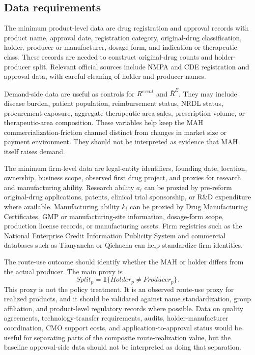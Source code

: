 \documentclass[12pt]{article}
\newcommand{\1}{\mathbf{1}}
\begin{document}
\subsection{Data requirements}

The minimum product-level data are drug registration and approval records with product name, approval date, registration category, original-drug classification, holder, producer or manufacturer, dosage form, and indication or therapeutic class. These records are needed to construct original-drug counts and holder-producer split. Relevant official sources include NMPA and CDE registration and approval data, with careful cleaning of holder and producer names.

Demand-side data are useful as controls for $R^{event}$ and $\bar R^E$. They may include disease burden, patient population, reimbursement status, NRDL status, procurement exposure, aggregate therapeutic-area sales, prescription volume, or therapeutic-area composition. These variables help keep the MAH commercialization-friction channel distinct from changes in market size or payment environment. They should not be interpreted as evidence that MAH itself raises demand.

The minimum firm-level data are legal-entity identifiers, founding date, location, ownership, business scope, observed first drug project, and proxies for research and manufacturing ability. Research ability $a_i$ can be proxied by pre-reform original-drug applications, patents, clinical trial sponsorship, or R\&D expenditure where available. Manufacturing ability $k_i$ can be proxied by Drug Manufacturing Certificates, GMP or manufacturing-site information, dosage-form scope, production license records, or manufacturing assets. Firm registries such as the National Enterprise Credit Information Publicity System and commercial databases such as Tianyancha or Qichacha can help standardize firm identities.

The route-use outcome should identify whether the MAH or holder differs from the actual producer. The main proxy is
\begin{equation}
    Split_p=\1\{Holder_p\ne Producer_p\}.
    \label{eq:split}
\end{equation}
This proxy is not the policy treatment. It is an observed route-use proxy for realized products, and it should be validated against name standardization, group affiliation, and product-level regulatory records where possible. Data on quality agreements, technology-transfer requirements, audits, holder-manufacturer coordination, CMO support costs, and application-to-approval status would be useful for separating parts of the composite route-realization value, but the baseline approval-side data should not be interpreted as doing that separation.
\end{document}
